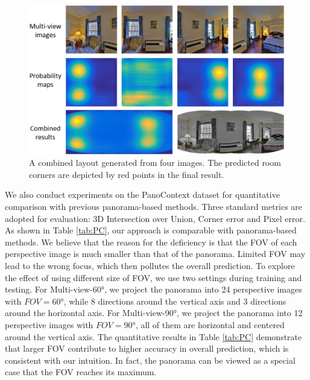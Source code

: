 \begin{figure}
	\centering
	\includegraphics[width=\linewidth]{figs/partial2.png}
	\caption{A combined layout generated from four images. The predicted room corners are depicted by red points in the final result.}
	\label{fig:partial2}
\end{figure}


We also conduct experiments on the PanoContext dataset for quantitative comparison with previous panorama-based methods.
%
Three standard metrics are adopted for evaluation: 3D Intersection over Union, Corner error and Pixel error. As shown in Table \ref{tab:PC}, our approach is comparable with panorama-based methods. 
%
We believe that the reason for the deficiency is that the FOV of each perspective image is much smaller than that of the panorama. Limited FOV may lead to the wrong focus, which then pollutes the overall prediction. 
%
To explore the effect of using different size of FOV, we use two settings during training and testing. For Multi-view-\ang{60}, we project the panorama into 24 perspective images with $FOV=\ang{60}$, while 8 directions around the vertical axis and 3 directions around the horizontal axis. For Multi-view-\ang{90}, we project the panorama into 12 perspective images with $FOV=\ang{90}$, all of them are horizontal and centered around the vertical axis. 
%
The quantitative results in Table \ref{tab:PC} demonstrate that larger FOV contribute to higher accuracy in overall prediction, which is consistent with our intuition. In fact, the panorama can be viewed as a special case that the FOV reaches its maximum.




